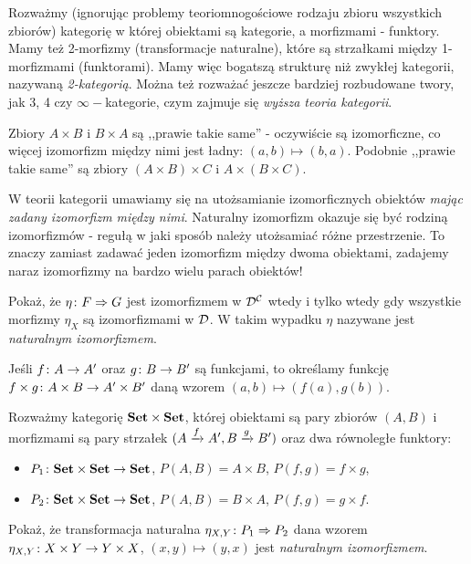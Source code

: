 \begin{remk}
  Rozważmy (ignorując problemy teoriomnogościowe rodzaju zbioru wszystkich zbiorów) kategorię w której obiektami są kategorie, a morfizmami - funktory. Mamy też 2-morfizmy (transformacje naturalne), które są strzałkami między 1-morfizmami (funktorami). Mamy więc bogatszą strukturę niż zwykłej kategorii, nazywaną \emph{2-kategorią}. Można też rozważać jeszcze bardziej rozbudowane twory, jak 3, 4 czy $\infty-$kategorie, czym zajmuje się \emph{wyższa teoria kategorii}.
\end{remk}

\begin{idea}
  \label{idea:prawie_takie_same}
  Zbiory $A\times B$ i $B\times A$ są ,,prawie takie same'' - oczywiście są izomorficzne, co więcej izomorfizm między nimi jest ładny: $(a, b)\mapsto (b, a)$. Podobnie ,,prawie takie same'' są zbiory $(A\times B)\times C$ i $A\times (B\times C)$.

  W teorii kategorii umawiamy się na utożsamianie izomorficznych obiektów \emph{mając zadany izomorfizm między nimi}. Naturalny izomorfizm okazuje się być rodziną izomorfizmów - regułą w jaki sposób należy utożsamiać różne przestrzenie. To znaczy zamiast zadawać jeden izomorfizm między dwoma obiektami, zadajemy naraz izomorfizmy na bardzo wielu parach obiektów!
\end{idea}

\begin{exc}
  Pokaż, że $\nattran \eta FG$ jest izomorfizmem w $\D^\C$ wtedy i tylko wtedy gdy wszystkie morfizmy $\eta_X$ są izomorfizmami w $\D$. W takim wypadku $\eta$ nazywane jest \emph{naturalnym izomorfizmem}.
\end{exc}

\begin{nott}
  Jeśli $\morph fA{A'}$ oraz $\morph gB{B'}$ są funkcjami, to określamy funkcję $\morph{f\times g}{A\times B}{A'\times B'}$ daną wzorem $(a, b)\mapsto (f(a), g(b))$.
\end{nott}

\begin{exc}
  Rozważmy kategorię $\Set\times \Set$, której obiektami są pary zbiorów $(A, B)$ i morfizmami są pary strzałek $(\morpharr fA {A'}, \morpharr gB{B'})$ oraz dwa równoległe funktory:
  \begin{itemize}
    \item $\morph {P_1}{\Set\times \Set}\Set$, $P(A, B)=A\times B$, $P(f, g) = f\times g$,
    \item $\morph {P_2}{\Set\times \Set}\Set$, $P(A, B)=B\times A$, $P(f, g) = g\times f$.
  \end{itemize}
  Pokaż, że transformacja naturalna $\nattran{\eta_{X, Y}}{P_1}{P_2}$ dana wzorem $\morph{\eta_{X, Y}}{X\times Y}{Y\times X}$, $(x, y)\mapsto (y, x)$ jest \emph{naturalnym izomorfizmem}.
\end{exc}

